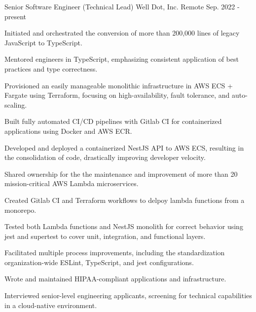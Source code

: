 

\begin{cventries}

  \cventry
    {Senior Software Engineer (Technical Lead)} %
    {Well Dot, Inc.} %
    {Remote} %
    {Sep. 2022 - present} %
    {
      \begin{cvitems} %
        \item {Initiated and orchestrated the conversion of more than 200,000 lines of legacy JavaScript to TypeScript.}
        \item {Mentored engineers in TypeScript, emphasizing consistent application of best practices and type correctness.}
        \item {Provisioned an easily manageable monolithic infrastructure in AWS ECS + Fargate using Terraform, focusing on high-availability, fault tolerance, and auto-scaling.}
        \item {Built fully automated CI/CD pipelines with Gitlab CI for containerized applications using Docker and AWS ECR.}
        \item {Developed and deployed a containerized NestJS API to AWS ECS, resulting in the consolidation of code, drastically improving developer velocity.}
        \item {Shared ownership for the the maintenance and improvement of more than 20 mission-critical AWS Lambda microservices.}
        \item {Created Gitlab CI and Terraform workflows to delpoy lambda functions from a monorepo.}
        \item {Tested both Lambda functions and NestJS monolith for correct behavior using jest and supertest to cover unit, integration, and functional layers.}
        \item {Facilitated multiple process improvements, including the standardization organization-wide ESLint, TypeScript, and jest configurations.}
        \item {Wrote and maintained HIPAA-compliant applications and infrastructure.}
        \item {Interviewed senior-level engineering applicants, screening for technical capabilities in a cloud-native environment.}
      \end{cvitems}
    }


\end{cventries}
